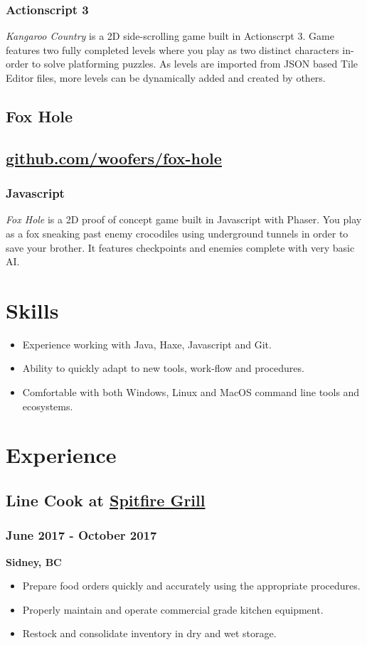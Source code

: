 \documentclass[letterpaper]{article}
\begin{document}
\subsubsection{Actionscript 3}
\label{sec-1-6-1}
\emph{Kangaroo Country} is a 2D side-scrolling game built in Actionscrpt 3. Game features two fully completed levels where you play as two distinct characters in-order to solve platforming puzzles. As levels are imported from JSON based Tile Editor files, more levels can be dynamically added and created by others.
\subsection{Fox Hole}
\label{sec-1-7}
\subsection{\href{https://github.com/woofers/fox-hole}{github.com/woofers/fox-hole}}
\label{sec-1-8}
\subsubsection{Javascript}
\label{sec-1-8-1}
\emph{Fox Hole} is a 2D proof of concept game built in Javascript with Phaser. You play as a fox sneaking past enemy crocodiles using underground tunnels in order to save your brother. It features checkpoints and enemies complete with very basic AI.
\section{Skills}
\label{sec-2}
\begin{itemize}
\item Experience working with Java, Haxe, Javascript and Git.
\item Ability to quickly adapt to new tools, work-flow and procedures.
\item Comfortable with both Windows, Linux and MacOS command line tools and ecosystems.
\end{itemize}
\section{Experience}
\label{sec-3}
\subsection{Line Cook at \href{https://www.spitfiregrill.ca/}{Spitfire Grill}}
\label{sec-3-1}
\subsubsection{June 2017 - October 2017}
\label{sec-3-1-1}
\textbf{Sidney, BC}
\begin{itemize}
\item Prepare food orders quickly and accurately using the appropriate procedures.
\item Properly maintain and operate commercial grade kitchen equipment.
\item Restock and consolidate inventory in dry and wet storage.
\end{itemize}
\end{document}
